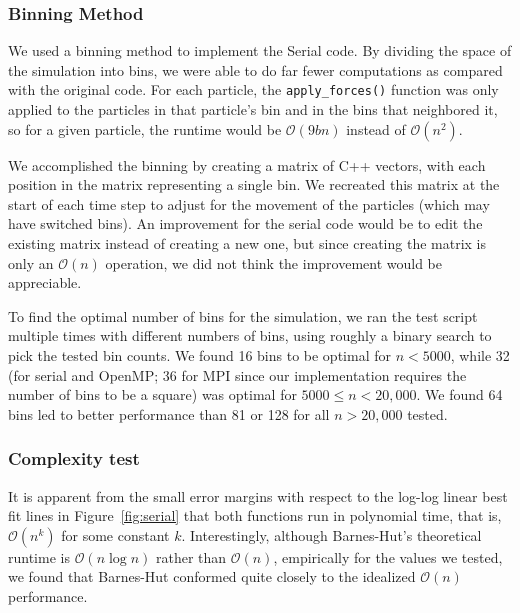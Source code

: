 \documentclass{article}
\begin{document}
\subsubsection{Binning Method}
We used a binning method to implement the Serial code. By dividing the space
of the simulation into bins, we were able to do far fewer computations as
compared with the original code. For each particle, the
\texttt{apply\_forces()} function was only applied to the particles in that
particle's bin and in the bins that neighbored it, so for a given particle, the
runtime would be $\mathcal{O}(9b n)$ instead of $\mathcal{O}(n^2)$.

We accomplished the binning by creating a matrix of C++ vectors, with each
position in the matrix representing a single bin. We recreated this matrix at
the start of each time step to adjust for the movement of the particles (which
may have switched bins). An improvement for the serial code would be to edit the
existing matrix instead of creating a new one, but since creating the matrix is
only an $\mathcal{O}(n)$ operation, we did not think the improvement would be
appreciable.

To find the optimal number of bins for the simulation, we ran the test script
multiple times with different numbers of bins, using roughly a binary search to
pick the tested bin counts. We found 16 bins to be optimal for $n < 5000$, while
32 (for serial and OpenMP; 36 for MPI since our implementation requires the
number of bins to be a square) was optimal for $5000 \le n < 20,000$. We found
64 bins led to better performance than 81 or 128 for all $n > 20,000$ tested.

\subsubsection{Complexity test}
It is apparent from the small error margins with respect to the log-log linear
best fit lines in Figure~\ref{fig:serial} that both functions run in polynomial
time, that is, $\mathcal{O}(n^k)$ for some constant $k$.  Interestingly,
although Barnes-Hut's theoretical runtime is $\mathcal{O}(n\log n)$ rather than
$\mathcal{O}(n)$, empirically for the values we tested, we found that Barnes-Hut
conformed quite closely to the idealized $\mathcal{O}(n)$ performance.
\end{document}
